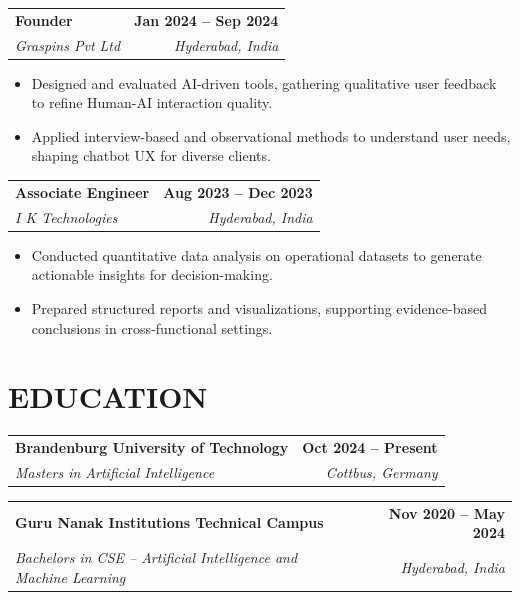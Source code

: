 \documentclass[a4paper,11pt]{article}
\makeatletter
\newcommand{\entryheader}[4]{%
  \begin{tabularx}{\textwidth}{@{}>{\RaggedRight\arraybackslash}X r@{}}
    \textbf{#1} & \textbf{#2} \\
    \textit{#3} & \textit{#4} \\
  \end{tabularx}%
}
\newenvironment{entrybullets}{%
  \begin{minipage}[t]{0.77\textwidth}
    \begin{itemize}[leftmargin=*,label=\textbullet,align=left]
}{%
    \end{itemize}
  \end{minipage}
}
\makeatother
\begin{document}
\vspace{0.25cm}
\entryheader{Founder}{Jan 2024 -- Sep 2024}{Graspins Pvt Ltd}{Hyderabad, India}
\begin{entrybullets}
  \item Designed and evaluated AI-driven tools, gathering qualitative user feedback to refine Human-AI interaction quality.
  \item Applied interview-based and observational methods to understand user needs, shaping chatbot UX for diverse clients.
\end{entrybullets}

\vspace{0.25cm}
\entryheader{Associate Engineer}{Aug 2023 -- Dec 2023}{I K Technologies}{Hyderabad, India}
\begin{entrybullets}
  \item Conducted quantitative data analysis on operational datasets to generate actionable insights for decision-making.
  \item Prepared structured reports and visualizations, supporting evidence-based conclusions in cross-functional settings.
\end{entrybullets}

\section*{EDUCATION}
\begin{tabularx}{\textwidth}{@{}X r@{}}
  \textbf{Brandenburg University of Technology} & \textbf{Oct 2024 -- Present} \\
  \textit{Masters in Artificial Intelligence} & \textit{Cottbus, Germany} \\
\end{tabularx}

\vspace{0.25cm}
\begin{tabularx}{\textwidth}{@{}X r@{}}
  \textbf{Guru Nanak Institutions Technical Campus} & \textbf{Nov 2020 -- May 2024} \\
  \textit{Bachelors in CSE -- Artificial Intelligence and Machine Learning} & \textit{Hyderabad, India} \\
\end{tabularx}

\end{document}
